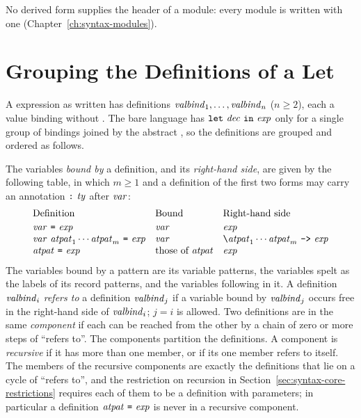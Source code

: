 No derived form supplies the header of a module: every module is written
with one (Chapter~\ref{ch:syntax-modules}). %

\section{Grouping the Definitions of a Let}
\label{sec:appendix-derived-forms-let}

A  expression as written has definitions $\mathit{valbind}_1,\ldots,\mathit{valbind}_n$
($n\geq 2$), each a value binding without . The bare language has
$\textnormal{\texttt{let}}\ \mathit{dec}\ \textnormal{\texttt{in}}\ \mathit{exp}$ only for a single group of bindings joined by
the abstract , so the definitions are grouped and ordered as follows.

The variables \emph{bound by} a definition, and its \emph{right-hand side},
are given by the following table, in which $m\geq 1$ and a definition of the
first two forms may carry an annotation $\textnormal{\texttt{:}}\ \mathit{ty}$ after $\mathit{var}$:
\[
  \begin{array}{lll}
    \text{Definition} & \text{Bound} & \text{Right-hand side}\\[2pt]
    \var\ \kw{=}\ \expm
      & \var & \expm\\
    \var\ \atpat_1\cdots\atpat_m\ \kw{=}\ \expm
      & \var & \kw{\textbackslash}\atpat_1\cdots\atpat_m\ \kw{->}\ \expm\\
    \atpat\ \kw{=}\ \expm
      & \text{those of}\ \atpat & \expm
  \end{array}
\]
The variables bound by a pattern are its variable patterns, the variables
spelt as the labels of its record patterns, and the variables following 
in it.
A definition $\mathit{valbind}_i$ \emph{refers to} a definition $\mathit{valbind}_j$ if a
variable bound by $\mathit{valbind}_j$ occurs free in the right-hand side of
$\mathit{valbind}_i$; $j=i$ is allowed. Two definitions are in the same
\emph{component} if each can be reached from the other by a chain of zero or
more steps of ``refers to''. The components partition the definitions. A
component is \emph{recursive} if it has more than one member, or if its one
member refers to itself. The members of the recursive components are exactly
the definitions that lie on a cycle of ``refers to'', and the restriction on
recursion in Section~\ref{sec:syntax-core-restrictions} requires each of them
to be a definition with parameters; in particular a definition
$\mathit{atpat}\ \textnormal{\texttt{=}}\ \mathit{exp}$ is never in a recursive component. %

